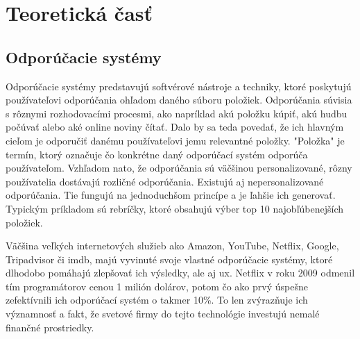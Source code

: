 \section{Teoretická časť}

\subsection{Odporúčacie systémy}
\label{sec:odporucacie systemy}
 Odporúčacie systémy predstavujú softvérové nástroje a techniky, ktoré poskytujú používateľovi odporúčania ohľadom daného súboru položiek. Odporúčania súvisia s rôznymi rozhodovacími procesmi, ako napríklad akú položku kúpiť, akú hudbu počúvať alebo aké online noviny čítať. Dalo by sa teda povedať, že ich hlavným cieľom je odporučiť danému používateľovi jemu relevantné položky. "Položka" je termín, ktorý označuje čo konkrétne daný odporúčací systém odporúča používateľom. Vzhľadom nato, že odporúčania sú väčšinou personalizované, rôzny používatelia dostávajú rozličné odporúčania. Existujú aj nepersonalizované odporúčania. Tie fungujú na jednoduchšom princípe a je ľahšie ich generovať. Typickým príkladom sú rebríčky, ktoré obsahujú výber top 10 najobľúbenejších položiek. \cite{rs1} 
 
Väčšina veľkých internetových služieb ako Amazon, YouTube, Netflix, Google, Tripadvisor či \acrshort{imdb}, majú vyvinuté svoje vlastné odporúčacie systémy, ktoré dlhodobo pomáhajú zlepšovať ich výsledky, ale aj \acrshort{ux}. Netflix v roku 2009 odmenil tím programátorov cenou 1 milión dolárov, potom čo ako prvý úspešne zefektívnili ich odporúčací systém o takmer 10\%. To len zvýrazňuje ich významnosť a fakt, že svetové firmy do tejto technológie investujú nemalé finančné prostriedky. \cite{rs1}

